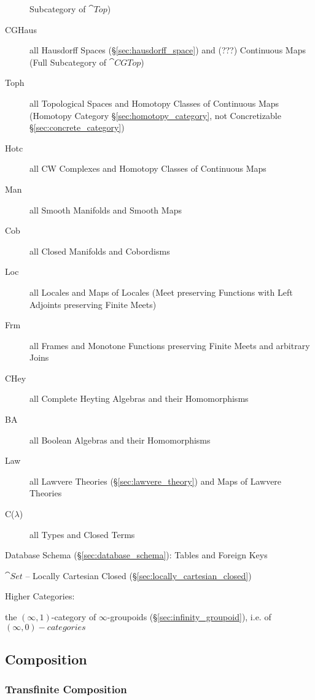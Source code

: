 \begin{description}
  Subcategory of $\cat{Top}$)
\item [CGHaus] all Hausdorff Spaces (\S\ref{sec:hausdorff_space}) and
  (???) Continuous Maps (Full Subcategory of $\cat{CGTop}$)
\item [Toph] all Topological Spaces and Homotopy Classes of Continuous
  Maps (Homotopy Category \S\ref{sec:homotopy_category}, not
  Concretizable \S\ref{sec:concrete_category})
\item [Hotc] all CW Complexes and Homotopy Classes of Continuous Maps
\item [Man] all Smooth Manifolds and Smooth Maps
\item [Cob] all Closed Manifolds and Cobordisms
\item [Loc] all Locales and Maps of Locales (Meet preserving Functions
  with Left Adjoints preserving Finite Meets)
\item [Frm] all Frames and Monotone Functions preserving Finite Meets
  and arbitrary Joins
\item [CHey] all Complete Heyting Algebras and their Homomorphisms
\item [BA] all Boolean Algebras and their Homomorphisms
\item [Law] all Lawvere Theories (\S\ref{sec:lawvere_theory}) and Maps
  of Lawvere Theories
\item [C($\lambda$)] all Types and Closed Terms
\end{description}

Database Schema (\S\ref{sec:database_schema}): Tables and Foreign Keys

$\cat{Set}$ -- Locally Cartesian Closed
(\S\ref{sec:locally_cartesian_closed})

Higher Categories:


\item [$\infty$Grpd] the $(\infty,1)$-category of $\infty$-groupoids
  (\S\ref{sec:infinity_groupoid}), i.e. of $(\infty,0)-categories$



\subsection{Composition}\label{sec:composition}

\subsubsection{Transfinite Composition}
\label{sec:transfinite_composition}

